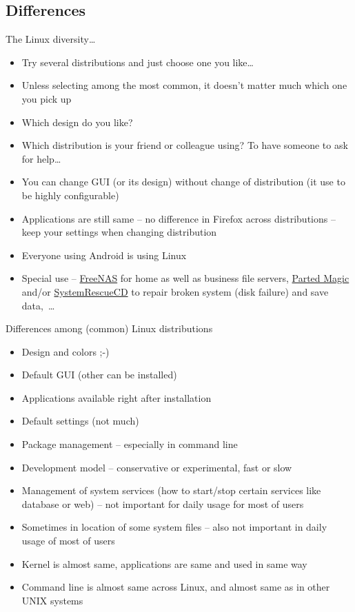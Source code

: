 \documentclass[compress, ucs, xelatex, 11pt, xcolor=svgnames,
  hyperref={
    bookmarks=true,
    unicode=true,
    colorlinks=true,
    pdftitle={Linux, command line and MetaCentrum},
    plainpages=false,
    pdfauthor={Vojtech Zeisek},
    pdfsubject={Course about use of Linux command line, writing shell scripts and using MetaCentrum of CESNET},
    pdfcreator={XeLaTeX},
    pdfkeywords={Linux, GNU, BASH, shell, command line, MetaCentrum},
    linkcolor=DarkRed,
    anchorcolor=DarkBlue,
    citecolor=Indigo,
    filecolor=NavyBlue,
    menucolor=DarkMagenta,
    urlcolor=DarkBlue,
    pdftex},
  url={hyphens, lowtilde} %
  ]{beamer}
\begin{document}
\subsection{Differences}

\begin{frame}{The Linux diversity\ldots}
  \begin{itemize}
    \item Try several distributions and just choose one you like\ldots
    \item Unless selecting among the most common, it doesn't matter much which one you pick up
    \item Which design do you like?
    \item Which distribution is your friend or colleague using? To have someone to ask for help\ldots
    \item You can change GUI (or its design) without change of distribution (it use to be highly configurable)
    \item Applications are still same -- no difference in Firefox across distributions -- keep your settings when changing distribution
    \item Everyone using Android is using Linux
    \item Special use -- \href{http://www.freenas.org/}{FreeNAS} for home as well as business file servers, \href{https://partedmagic.com/}{Parted Magic} and/or \href{https://www.system-rescue-cd.org/SystemRescueCd_Homepage}{SystemRescueCD} to repair broken system (disk failure) and save data,~\ldots
  \end{itemize}
\end{frame}

\begin{frame}{Differences among (common) Linux distributions}
  \begin{itemize}
    \item Design and colors ;-)
    \item Default GUI (other can be installed)
    \item Applications available right after installation
    \item Default settings (not much)
    \item Package management -- especially in command line
    \item Development model -- conservative or experimental, fast or slow
    \item Management of system services (how to start/stop certain services like database or web) -- not important for daily usage for most of users
    \item Sometimes in location of some system files -- also not important in daily usage of most of users
    \item Kernel is almost same, applications are same and used in same way
    \item Command line is almost same across Linux, and almost same as in other UNIX systems
  \end{itemize}
\end{frame}
\end{document}
